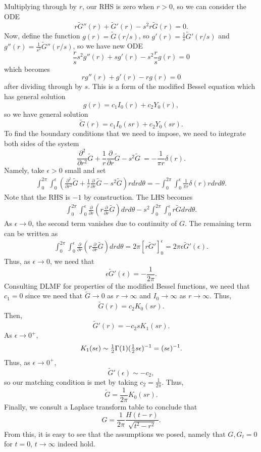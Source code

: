\documentclass{article}
\begin{document}
Multiplying through by $r$, our RHS is zero when $r>0$, so we can consider the ODE
\[
r\tilde{G}''(r)+\tilde{G}'(r)-s^2r\tilde{G}(r)=0.
\]
Now, define the function $g(r)=\tilde{G}(r/s)$, so $g'(r)=\frac{1}{s}\tilde{G}'(r/s)$ and $g''(r)=\frac{1}{s^2}\tilde{G}''(r/s)$, so we have new ODE
\[
\frac{r}{s}s^2g''(r)+sg'(r)-s^2\frac{r}{s}g(r)=0
\]
which becomes
\[
rg''(r)+g'(r)-rg(r)=0
\]
after dividing through by $s$. This is a form of the modified Bessel equation which has general solution
\[
g(r)=c_1I_0(r)+c_2Y_0(r),
\]
so we have general solution
\[
\tilde{G}(r)=c_1I_0(sr)+c_2Y_0(sr).
\]
To find the boundary conditions that we need to impose, we need to integrate both sides of the system 
\[
\frac{\partial^2}{\partial r^2}\tilde{G}+\frac{1}{r}\frac{\partial}{\partial r}\tilde{G}-s^2\tilde{G}\ = -\frac{1}{\pi r}\delta(r).
\]
Namely, take $\epsilon>0$ small and set
\begin{align*}
\int_0^{2\pi}\int_0^\epsilon\left(\frac{\partial^2}{\partial r^2}\tilde{G}+\frac{1}{r}\frac{\partial}{\partial r}\tilde{G}-s^2\tilde{G}\right)rdrd\theta=-\int_0^{2\pi}\int_0^\epsilon\frac{1}{\pi r}\delta(r)rdrd\theta.
\end{align*}
Note that the RHS is $-1$ by construction. The LHS becomes
\begin{align*}
\int_0^{2\pi}\int_0^\epsilon\frac{\partial}{\partial r}\left(r\frac{\partial}{\partial r}\tilde{G}\right)drd\theta-s^2\int_0^{2\pi}\int_0^\epsilon r\tilde{G}drd\theta.
\end{align*}
As $\epsilon\to0$, the second term vanishes due to continuity of $G$. The remaining term can be written as 
\begin{align*}
\int_0^{2\pi}\int_0^\epsilon\frac{\partial}{\partial r}\left(r\frac{\partial}{\partial r}\tilde{G}\right)drd\theta=2\pi\left[r\tilde{G}'\right]_0^\epsilon=2\pi \epsilon\tilde{G}'(\epsilon).
\end{align*}
Thus, as $\epsilon\to0$, we need that 
\[
\epsilon\tilde{G}'(\epsilon)=-\frac{1}{2\pi}.
\]
Consulting DLMF for properties of the modified Bessel functions, we need that $c_1=0$ since we need that $\tilde{G}\to0$ as $r\to\infty$ and $I_0\to\infty$ as $r\to\infty$. Thus,
\[
\tilde{G}(r)=c_2K_0(sr).
\]
Then,
\[
\tilde{G}'(r)=-c_2sK_1(sr).
\]
As $\epsilon\to0^+$, 
\[
K_1(s\epsilon)\sim\mbox{$\frac{1}{2}$}\Gamma(1)(\mbox{$\frac{1}{2}$} s\epsilon)^{-1}=(s\epsilon)^{-1}.
\]
Thus, as $\epsilon\to0^+$, 
\[
\tilde{G}'(\epsilon)\sim-c_2,
\]
so our matching condition is met by taking $c_2=\frac{1}{2\pi}$. Thus,
\[
\tilde{G}=\frac{1}{2\pi}K_0(sr).
\]
Finally, we consult a Laplace transform table to conclude that 
\[
G = \frac{1}{2\pi}\frac{H(t-r)}{\sqrt{t^2-r^2}}.
\]
From this, it is easy to see that the assumptions we posed, namely that $G,G_t=0$ for $t=0$, $t\to\infty$ indeed hold.
\end{document}
